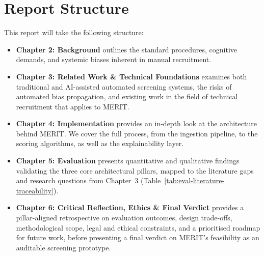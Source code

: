 \section{Report Structure}
This report will take the following structure:
\begin{itemize}
  \item \textbf{Chapter 2: Background} outlines the standard procedures, cognitive demands, and systemic biases 
  inherent in manual recruitment.
  \item \textbf{Chapter 3: Related Work \& Technical Foundations} examines both traditional and AI-assisted automated 
  screening systems, the risks of automated bias propagation, and existing work in the field of technical recruitment that applies to MERIT.
  \item \textbf{Chapter 4: Implementation} provides an in-depth look at the architecture behind MERIT. We cover the full process,
  from the ingestion pipeline, to the scoring algorithms, as well as the explainability layer.
  \item \textbf{Chapter 5: Evaluation} presents quantitative and qualitative findings validating the three core 
  architectural pillars, mapped to the literature gaps and research questions from Chapter~3 (Table~\ref{tab:eval-literature-traceability}).
  \item \textbf{Chapter 6: Critical Reflection, Ethics \& Final Verdict} provides a pillar-aligned retrospective on
  evaluation outcomes, design trade-offs, methodological scope, legal and ethical constraints, and a prioritised
  roadmap for future work, before presenting a final verdict on MERIT's feasibility as an auditable screening prototype.
\end{itemize}